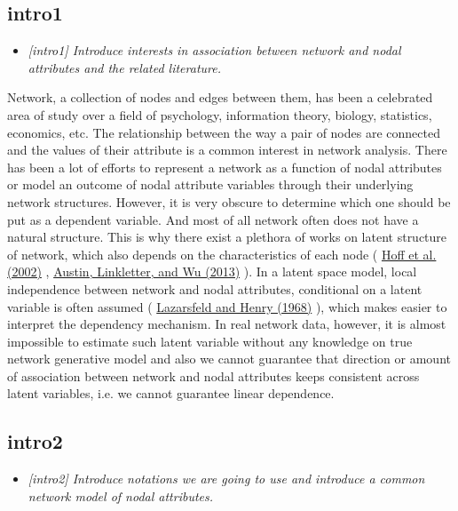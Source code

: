\documentclass[12pt]{article}
\theoremstyle{definition}
\begin{document}
\subsection{intro1}
\begin{itemize}
\item {\it  [intro1] Introduce interests in association between network and nodal attributes and the related literature.   \/}
\end{itemize}

Network, a collection of nodes and edges between them, has been a celebrated area of study over a field of psychology, information theory, biology, statistics, economics, etc. The relationship between the way a pair of nodes are connected and the values of their attribute is a common interest in network analysis. There has been a lot of efforts to represent a network as a function of nodal attributes or model an outcome of nodal attribute variables through their underlying network structures. However, it is very obscure to determine which one should be put as a dependent variable. And most of all network often does not have a natural structure. This is why there exist a plethora of works on latent structure of network, which also depends on the characteristics of each node ( \hyperlink{Hoff}{Hoff et al. (2002)}  , \hyperlink{Austin}{Austin, Linkletter, and Wu (2013)} ). In a latent space model, local independence between network and nodal attributes, conditional on a latent variable is often assumed ( \hyperlink{Lazarsfeld}{Lazarsfeld and Henry (1968)} ), which makes easier to interpret the dependency mechanism. In real network data, however, it is almost impossible to estimate such latent variable without any knowledge on true network generative model and also we cannot guarantee that direction or amount of association between network and nodal attributes keeps consistent across latent variables, i.e. we cannot guarantee linear dependence. 


\subsection{intro2}
\begin{itemize}
	\item {\it  [intro2] Introduce notations we are going to use and introduce a common network model of nodal attributes.   \/}
\end{itemize}
\end{document}
